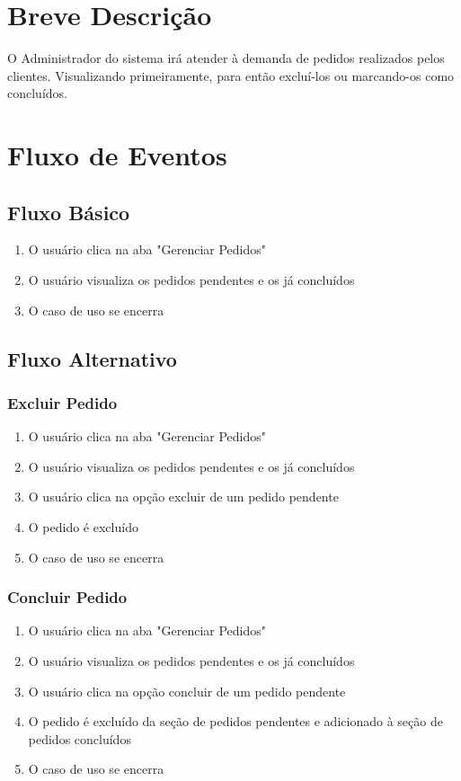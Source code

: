 \section{Breve Descrição}

O Administrador do sistema irá atender à demanda de pedidos realizados pelos clientes. Visualizando primeiramente, para então excluí-los ou marcando-os como concluídos.


\section{Fluxo de Eventos}
\subsection{Fluxo Básico}

\begin{enumerate}
	\item O usuário clica na aba "Gerenciar Pedidos"
	\item O usuário visualiza os pedidos pendentes e os já concluídos
	\item O caso de uso se encerra
\end{enumerate}

\subsection{Fluxo Alternativo}
\subsubsection{Excluir Pedido}
\begin{enumerate}
	\item O usuário clica na aba "Gerenciar Pedidos"
	\item O usuário visualiza os pedidos pendentes e os já concluídos
	\item O usuário clica na opção excluir de um pedido pendente
	\item O pedido é excluído
	\item O caso de uso se encerra
\end{enumerate}

\subsubsection{Concluir Pedido}
\begin{enumerate}
	\item O usuário clica na aba "Gerenciar Pedidos"
	\item O usuário visualiza os pedidos pendentes e os já concluídos
	\item O usuário clica na opção concluir de um pedido pendente
	\item O pedido é excluído da seção de pedidos pendentes e adicionado à seção de pedidos concluídos
	\item O caso de uso se encerra
\end{enumerate}

